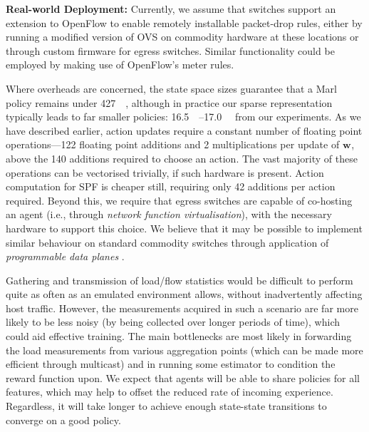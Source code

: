\documentclass[conference, a4paper, 10pt, times]{IEEEtran}
\newcommand{\wvec}[1]{\ensuremath{\bm{w}_{#1}}}
\newcommand{\fakepara}[1]{\noindent\textbf{#1:}}
\begin{document}
\fakepara{Real-world Deployment}
Currently, we assume that switches support an extension to OpenFlow to enable remotely installable packet-drop rules, either by running a modified version of OVS on commodity hardware at these locations or through custom firmware for egress switches.
Similar functionality could be employed by making use of OpenFlow's meter rules.

Where overheads are concerned, the state space sizes guarantee that a Marl policy remains under \SI{427}{\kibi\byte}, although in practice our sparse representation typically leads to far smaller policies: \SIrange{16.5}{17.0}{\kibi\byte} from our experiments.
As we have described earlier, action updates require a constant number of floating point operations---\num{122} floating point additions and \num{2} multiplications per update of $\wvec{}$, above the \num{140} additions required to choose an action.
The vast majority of these operations can be vectorised trivially, if such hardware is present.
Action computation for SPF is cheaper still, requiring only \num{42} additions per action required.
Beyond this, we require that egress switches are capable of co-hosting an agent (i.e., through \emph{network function virtualisation}), with the necessary hardware to support this choice.
We believe that it may be possible to implement similar behaviour on standard commodity switches through application of \emph{programmable data planes} \cite{DBLP:conf/ancs/JouetP17}.

Gathering and transmission of load/flow statistics would be difficult to perform quite as often as an emulated environment allows, without inadvertently affecting host traffic.
However, the measurements acquired in such a scenario are far more likely to be less noisy (by being collected over longer periods of time), which could aid effective training.
The main bottlenecks are most likely in forwarding the load measurements from various aggregation points (which can be made more efficient through multicast) and in running some estimator to condition the reward function upon.
We expect that agents will be able to share policies for all features, which may help to offset the reduced rate of incoming experience.
Regardless, it will take longer to achieve enough state-state transitions to converge on a good policy.
\end{document}
